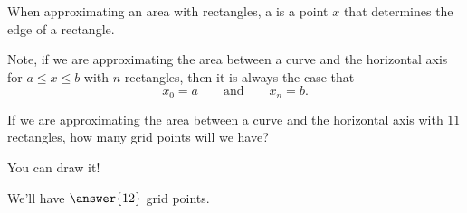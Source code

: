 \documentclass{ximera}
\begin{document}
\begin{definition}
  When approximating an area with rectangles, a  is a
  point $x$ that determines the edge of a rectangle.
\begin{image}
\end{image}
Note, if we are approximating the area between a curve and the
horizontal axis for $a\le x\le b$ with $n$ rectangles, then it is always the case that
\[
x_0=a\qquad\text{and}\qquad x_n = b.
\]
\end{definition}

\begin{question}
  If we are approximating the area between a curve and the horizontal
  axis with $11$ rectangles, how many grid points will we have?
  \begin{hint}
    You can draw it!
  \end{hint}
  \begin{prompt}
    We'll have $\answer{12}$ grid points.
  \end{prompt}
\end{question}
\end{document}
